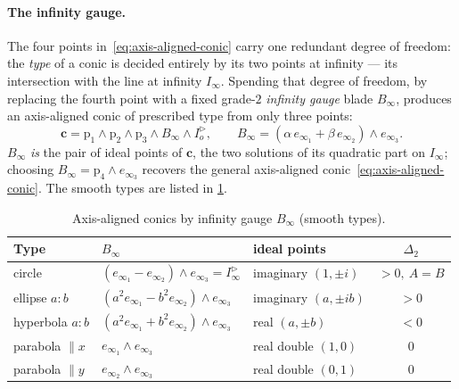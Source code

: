 \documentclass{birkjour}
\theoremstyle{definition}
\theoremstyle{remark}
\newcommand{\Iod}{I_o^{\triangleright}}      %
\newcommand{\Iinfd}{I_\infty^{\triangleright}}%
\newcommand{\Iinf}{I_\infty}
\newcommand{\joinp}{\wedge}
\begin{document}
\paragraph{The infinity gauge.}
The four points in~\eqref{eq:axis-aligned-conic} carry one redundant degree of
freedom: the \emph{type} of a conic is decided entirely by its two points at
infinity --- its intersection with the line at infinity $\Iinf$. Spending that
degree of freedom, by replacing the fourth point with a fixed grade-$2$
\emph{infinity gauge} blade $B_\infty$, produces an axis-aligned conic of
prescribed type from only three points:
\begin{equation}\label{eq:axis-conic-family}
  \mathbf{c} = \mathrm{p}_1\joinp \mathrm{p}_2\joinp \mathrm{p}_3
               \joinp B_\infty \joinp \Iod,
  \qquad
  B_\infty = (\alpha\,e_{\infty_1} + \beta\,e_{\infty_2})\joinp e_{\infty_3}.
\end{equation}
$B_\infty$ \emph{is} the pair of ideal points of $\mathbf{c}$, the two solutions of
its quadratic part on $\Iinf$; choosing $B_\infty = \mathrm{p}_4\joinp e_{\infty_3}$
recovers the general axis-aligned conic~\eqref{eq:axis-aligned-conic}. The smooth
types are listed in \cref{tab:axis-conics}.

\begin{table}[H]
\centering
\caption{Axis-aligned conics by infinity gauge $B_\infty$ (smooth types).}
\label{tab:axis-conics}
\begin{tabular}{@{}lllc@{}}
\toprule
Type & $B_\infty$ & ideal points & $\Delta_2$ \\
\midrule
circle           & $(e_{\infty_1}-e_{\infty_2})\joinp e_{\infty_3}=\Iinfd$       & imaginary $(1,\pm i)$  & $>0,\ A{=}B$ \\
ellipse $a{:}b$  & $(a^2 e_{\infty_1}-b^2 e_{\infty_2})\joinp e_{\infty_3}$       & imaginary $(a,\pm ib)$ & $>0$ \\
hyperbola $a{:}b$& $(a^2 e_{\infty_1}+b^2 e_{\infty_2})\joinp e_{\infty_3}$       & real $(a,\pm b)$       & $<0$ \\
parabola $\parallel x$ & $e_{\infty_1}\joinp e_{\infty_3}$                       & real double $(1,0)$    & $0$ \\
parabola $\parallel y$ & $e_{\infty_2}\joinp e_{\infty_3}$                       & real double $(0,1)$    & $0$ \\
\bottomrule
\end{tabular}
\end{table}
\end{document}
